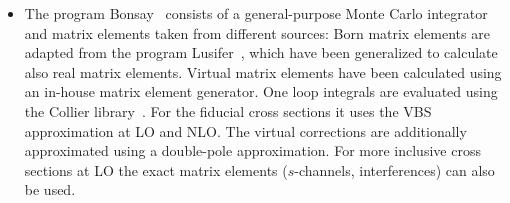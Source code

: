 \documentclass[twocolumn,epjc3]{svjour3} %
\begin{document}
    \begin{itemize}

    \item The program {\sc Bonsay}~\cite{Dittmaier:2018zzz} consists of a general-purpose Monte Carlo integrator and matrix elements taken from different sources:
    Born matrix elements are adapted from the program {\sc Lusifer}~\cite{Dittmaier:2002ap}, which have been generalized to calculate also real matrix elements.
    Virtual matrix elements have been calculated using an in-house matrix element generator.
    One loop integrals are evaluated using the {\sc Collier} library~\cite{Denner:2014gla,Denner:2016kdg}.
    For the fiducial cross sections it uses the VBS approximation at LO and NLO.
    The virtual corrections are additionally approximated using a double-pole approximation.
    For more inclusive cross sections at LO the exact matrix elements ($s$-channels, interferences) can also be used.


\end{itemize}
\end{document}
